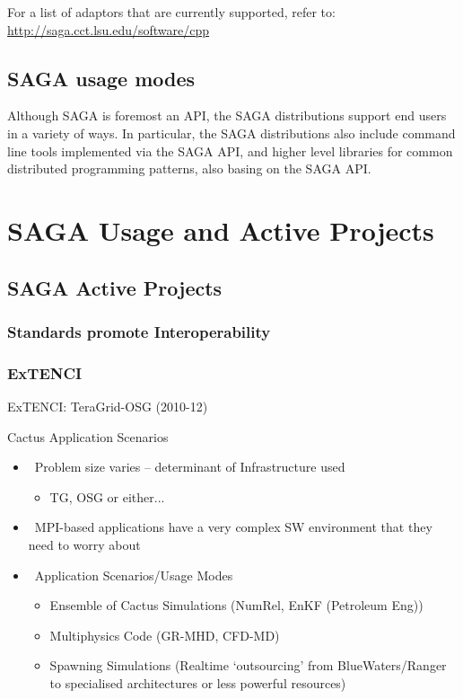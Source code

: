 \documentclass[12pt]{article}
\begin{document}
 For a list of adaptors that are currently supported, refer to:
 \url{http://saga.cct.lsu.edu/software/cpp}

 \subsection{SAGA usage modes}

 Although SAGA is foremost an API, the SAGA distributions support end
 users in a variety of ways.  In particular, the SAGA distributions
 also include command line tools implemented via the SAGA API, and
 higher level libraries for common distributed programming patterns,
 also basing on the SAGA API.


\section{SAGA Usage and Active Projects}

\subsection{SAGA Active Projects}

 \subsubsection{Standards promote Interoperability}

 \subsubsection*{ExTENCI}

  ExTENCI: TeraGrid-OSG (2010-12)

  Cactus Application Scenarios
 
  \begin{itemize}  

   \item  Problem size varies – determinant of Infrastructure used
          \begin{itemize}
           \item TG, OSG or either...
          \end{itemize}
 
   \item  MPI-based applications have a very complex SW environment
          that they need to worry about
 
   \item  Application Scenarios/Usage Modes
          \begin{itemize}
           \item Ensemble of Cactus Simulations (NumRel, EnKF
                 (Petroleum Eng))
           \item Multiphysics Code (GR-MHD, CFD-MD)
           \item Spawning Simulations (Realtime ‘outsourcing’ from
                 BlueWaters/Ranger to specialised architectures or 
                 less powerful resources)
          \end{itemize}
 
  \end{itemize}
\end{document}
